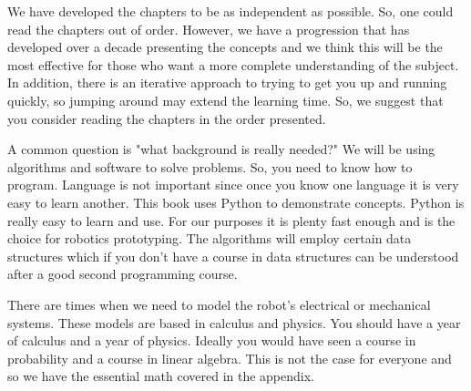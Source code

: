 We have developed the chapters to be as independent as possible. So, one
could read the chapters out of order. However, we have a progression
that has developed over a decade presenting the concepts and we think
this will be the most effective for those who want a more complete
understanding of the subject. In addition, there is an iterative
approach to trying to get you up and running quickly, so jumping around
may extend the learning time. So, we suggest that you consider reading
the chapters in the order presented.

A common question is "what background is really needed?" We will be
using algorithms and software to solve problems. So, you need to know
how to program. Language is not important since once you know one
language it is very easy to learn another. This book uses Python to
demonstrate concepts. Python is really easy to learn and use. For our
purposes it is plenty fast enough and is the choice for robotics
prototyping. The algorithms will employ certain data structures which if
you don't have a course in data structures can be understood after a
good second programming course.

There are times when we need to model the robot's electrical or
mechanical systems. These models are based in calculus and physics. You
should have a year of calculus and a year of physics. Ideally you would
have seen a course in probability and a course in linear algebra. This
is not the case for everyone and so we have the essential math covered
in the appendix.
